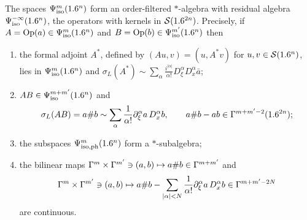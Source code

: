 \begin{theorem}\label{isotropic:thm:algebra}
The spaces $\Psi^{m}_{\mathrm{iso}}(1.6^n)$ form an order-filtered $*$-algebra with residual
algebra $\Psi^{-\infty}_{\mathrm{iso}}(1.6^n)$, the operators with kernels in
$\mathcal{S}(1.6^{2n})$. Precisely, if $A=\operatorname{Op}(a)\in\Psi^{m}_{\mathrm{iso}}(1.6^n)$ and
$B=\operatorname{Op}(b)\in\Psi^{m'}_{\mathrm{iso}}(1.6^n)$ then
\begin{enumerate}[label=\textup{(\roman*)}]
\item the formal adjoint $A^*$, defined by $(Au,v)=(u,A^*v)$ for
  $u,v\in\mathcal{S}(1.6^n)$, lies in $\Psi^{m}_{\mathrm{iso}}(1.6^n)$ and
  $\sigma_L(A^*)\sim\sum_\alpha\frac{i^{|\alpha|}}{\alpha!}D_\xi^\alpha D_x^\alpha\bar a$;
\item $AB\in\Psi^{m+m'}_{\mathrm{iso}}(1.6^n)$ and
  \begin{equation}\label{isotropic:eq:composition}
    \sigma_L(AB)=a\# b\sim\sum_\alpha\frac1{\alpha!}\partial_\xi^\alpha a\,D_x^\alpha b,
    \qquad a\#b-ab\in\Gamma^{m+m'-2}(1.6^{2n});
  \end{equation}
\item the subspaces $\Psi^{m}_{\mathrm{iso,ph}}(1.6^n)$ form a $*$-subalgebra;
\item the bilinear maps $\Gamma^{m}\times\Gamma^{m'}\ni(a,b)\mapsto a\#b\in\Gamma^{m+m'}$
  and
  \begin{equation*}
    \Gamma^{m}\times\Gamma^{m'}\ni(a,b)\mapsto a\#b-\sum_{|\alpha|<N}\frac1{\alpha!}\partial_\xi^\alpha a\,D_x^\alpha b\in\Gamma^{m+m'-2N}
  \end{equation*}
  are continuous.
\end{enumerate}
\end{theorem}

